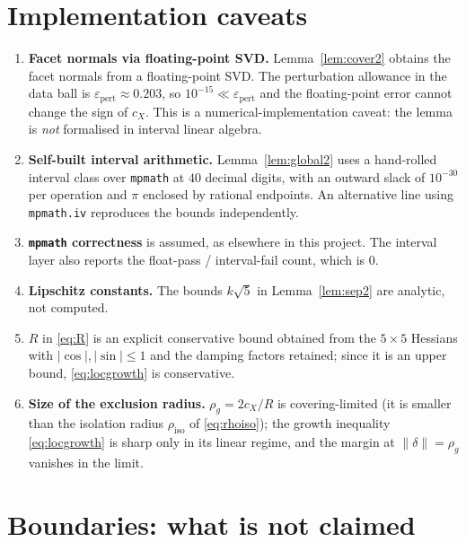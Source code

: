 \documentclass[11pt]{article}
\theoremstyle{remark}
\begin{document}
\section{Implementation caveats}

\begin{enumerate}
\item \textbf{Facet normals via floating-point SVD.} Lemma~\ref{lem:cover2} obtains the facet normals from
a floating-point SVD. The perturbation allowance in the data ball is
$\varepsilon_{\mathrm{pert}}\approx0.203$, so $10^{-15}\ll\varepsilon_{\mathrm{pert}}$ and the
floating-point error cannot change the sign of $c_X$. This is a numerical-implementation caveat: the lemma
is \emph{not} formalised in interval linear algebra.
\item \textbf{Self-built interval arithmetic.} Lemma~\ref{lem:global2} uses a hand-rolled interval class
over \texttt{mpmath} at $40$ decimal digits, with an outward slack of $10^{-30}$ per operation and $\pi$
enclosed by rational endpoints. An alternative line using \texttt{mpmath.iv} reproduces the bounds
independently.
\item \textbf{\texttt{mpmath} correctness} is assumed, as elsewhere in this project. The interval layer
also reports the float-pass / interval-fail count, which is $0$.
\item \textbf{Lipschitz constants.} The bounds $k\sqrt5$ in Lemma~\ref{lem:sep2} are analytic, not computed.
\item \textbf{$R$} in \eqref{eq:R} is an explicit conservative bound obtained from the $5\times5$ Hessians
with $|\cos|,|\sin|\le1$ and the damping factors retained; since it is an upper bound,
\eqref{eq:locgrowth} is conservative.
\item \textbf{Size of the exclusion radius.} $\rho_g=2c_X/R$ is covering-limited (it is smaller than the
isolation radius $\rho_{\mathrm{iso}}$ of \eqref{eq:rhoiso}); the growth inequality \eqref{eq:locgrowth} is
sharp only in its linear regime, and the margin at $\|\delta\|=\rho_g$ vanishes in the limit.
\end{enumerate}

\section{Boundaries: what is not claimed}
\end{document}
